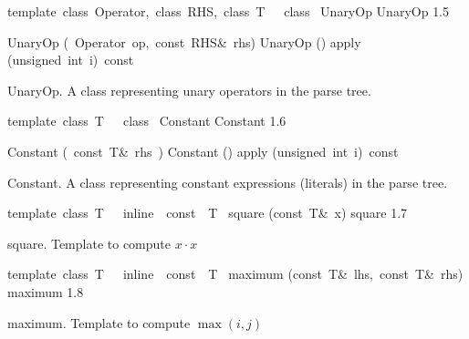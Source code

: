\documentclass{article}
\begin{document}
\begin{cxxentry}
\begin{cxxclass}
\begin{cxxdoc}
\end{cxxdoc}
\end{cxxclass}
\begin{cxxclass}
{template\ \<class\ Operator,\ class\ RHS,\ class\ T\>\ \ \ class\ }
        {UnaryOp}
        {}
        {UnaryOp
}
        {1.5}
\begin{cxxpublic}
\cxxitem{}
        {UnaryOp}
        {(\ Operator\ op,\ const\ RHS\&\ rhs)}
        {}
        {}
\label{cxx.1.5.1}
\cxxitem{}
        {\cxxtilde UnaryOp}
        {()}
        {}
        {}
\label{cxx.1.5.2}
        {apply}
        {(unsigned\ int\ i)\ const\ }
        {}
        {}
\label{cxx.1.5.3}
\end{cxxpublic}
\begin{cxxdoc}
UnaryOp.
A class representing unary operators in the parse tree.


\end{cxxdoc}
\end{cxxclass}
\begin{cxxclass}
{template\ \<class\ T\>\ \ \ class\ }
        {Constant}
        {}
        {Constant
}
        {1.6}
\begin{cxxpublic}
\cxxitem{}
        {Constant}
        {(\ const\ T\&\ rhs\ )}
        {}
        {}
\label{cxx.1.6.1}
\cxxitem{}
        {\cxxtilde Constant}
        {()}
        {}
        {}
\label{cxx.1.6.2}
        {apply}
        {(unsigned\ int\ i)\ const\ }
        {}
        {}
\label{cxx.1.6.3}
\end{cxxpublic}
\begin{cxxdoc}
Constant.
A class representing constant expressions (literals) in the parse tree.


\end{cxxdoc}
\end{cxxclass}
\begin{cxxfunction}
{template\ \<class\ T\>\ \ \ inline\ \ const\ \ T\ }
        {square}
        {(const\ T\&\ x)}
        {square}
        {1.7}
\begin{cxxdoc}
square.
Template to compute $x\cdot x$


\end{cxxdoc}
\end{cxxfunction}
\begin{cxxfunction}
{template\ \<class\ T\>\ \ \ inline\ \ const\ \ T\ }
        {maximum}
        {(const\ T\&\ lhs,\ const\ T\&\ rhs)}
        {maximum}
        {1.8}
\begin{cxxdoc}
maximum.
Template to compute $\max(i,j)$



\end{cxxdoc}
\end{cxxfunction}
\end{cxxentry}
\end{document}

